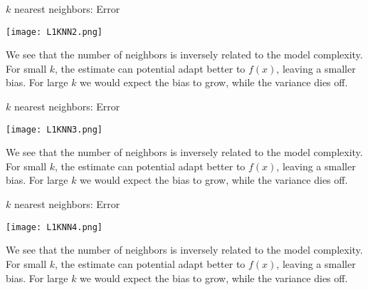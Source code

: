 \documentclass[10pt, table, dvipsnames,handout]{beamer}
\begin{document}
\begin{frame}[fragile]{$k$ nearest neighbors: Error}
  \begin{minipage}[t][0.5\textheight][t]{\textwidth}
	  \centering \texttt{[image: L1KNN2.png]}
  \end{minipage}
  \vfill
  \begin{minipage}[t][0.5\textheight][t]{\textwidth}

We see that the number of neighbors is inversely related to the model complexity. For small $k$, the estimate can potential adapt better to $f(x)$, leaving a smaller bias. For large $k$ we would expect the bias to grow, while the variance dies off. 
\end{minipage}

\end{frame}


\begin{frame}[fragile]{$k$ nearest neighbors: Error}
  \begin{minipage}[t][0.5\textheight][t]{\textwidth}
	  \centering \texttt{[image: L1KNN3.png]}
  \end{minipage}
  \vfill
  \begin{minipage}[t][0.5\textheight][t]{\textwidth}

We see that the number of neighbors is inversely related to the model complexity. For small $k$, the estimate can potential adapt better to $f(x)$, leaving a smaller bias. For large $k$ we would expect the bias to grow, while the variance dies off. 
\end{minipage}

\end{frame}


\begin{frame}[fragile]{$k$ nearest neighbors: Error}
  \begin{minipage}[t][0.5\textheight][t]{\textwidth}
	  \centering \texttt{[image: L1KNN4.png]}
  \end{minipage}
  \vfill
  \begin{minipage}[t][0.5\textheight][t]{\textwidth}

We see that the number of neighbors is inversely related to the model complexity. For small $k$, the estimate can potential adapt better to $f(x)$, leaving a smaller bias. For large $k$ we would expect the bias to grow, while the variance dies off. 
\end{minipage}

\end{frame}
\end{document}
